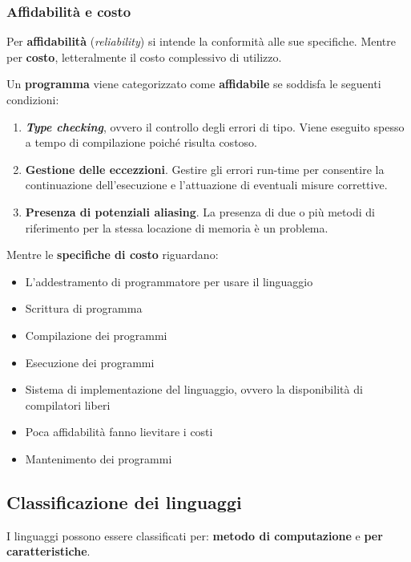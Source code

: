 \documentclass[a4paper]{article}
\begin{document}
	\subsubsection{Affidabilità e costo}
	
	Per \textcolor{Red3}{\textbf{affidabilità}} (\emph{reliability}) si intende la conformità alle sue specifiche. Mentre per \textcolor{Red3}{\textbf{costo}}, letteralmente il costo complessivo di utilizzo.\newline
	
	\noindent
	Un \textbf{programma} viene categorizzato come \textbf{affidabile} se soddisfa le seguenti condizioni:
	\begin{enumerate}
		\item \textbf{\emph{Type checking}}, ovvero il controllo degli errori di tipo. Viene eseguito spesso a tempo di compilazione poiché risulta costoso.
		
		\item \textbf{Gestione delle eccezzioni}. Gestire gli errori run-time per consentire la continuazione dell'esecuzione e l'attuazione di eventuali misure correttive.
		
		\item \textbf{Presenza di potenziali aliasing}. La presenza di due o più metodi di riferimento per la stessa locazione di memoria è un problema.
	\end{enumerate}

	\noindent
	Mentre le \textbf{specifiche di costo} riguardano:
	\begin{itemize}
		\item L'addestramento di programmatore per usare il linguaggio
		\item Scrittura di programma
		\item Compilazione dei programmi
		\item Esecuzione dei programmi
		\item Sistema di implementazione del linguaggio, ovvero la disponibilità di compilatori liberi
		\item Poca affidabilità fanno lievitare i costi
		\item Mantenimento dei programmi
	\end{itemize}\newpage

	\subsection{Classificazione dei linguaggi}
	
	I linguaggi possono essere classificati per: \textbf{metodo di computazione} e \textbf{per caratteristiche}.
	
\end{document}
